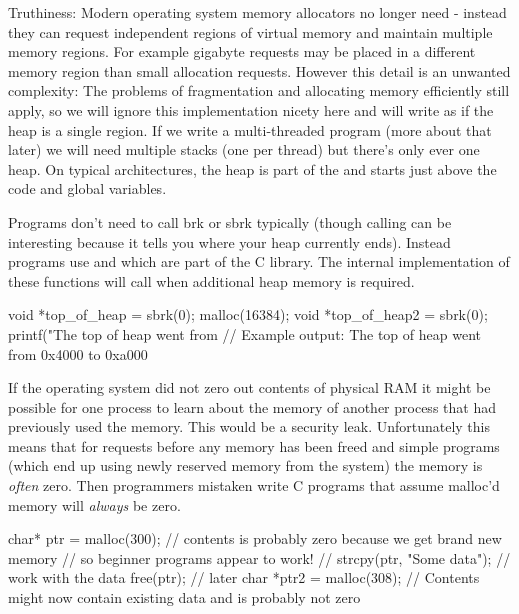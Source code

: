 Truthiness: Modern operating system memory allocators no longer need  - instead they can request independent regions of virtual memory and maintain multiple memory regions. For example gigabyte requests may be placed in a different memory region than small allocation requests. However this detail is an unwanted complexity: The problems of fragmentation and allocating memory efficiently still apply, so we will ignore this implementation nicety here and will write as if the heap is a single region. If we write a multi-threaded program (more about that later) we will need multiple stacks (one per thread) but there's only ever one heap. On typical architectures, the heap is part of the  and starts just above the code and global variables.

Programs don't need to call brk or sbrk typically (though calling  can be interesting because it tells you where your heap currently ends). Instead programs use  and  which are part of the C library. The internal implementation of these functions will call  when additional heap memory is required.

\begin{code}[language=C]
void *top_of_heap = sbrk(0);
malloc(16384);
void *top_of_heap2 = sbrk(0);
printf("The top of heap went from %
// Example output: The top of heap went from 0x4000 to 0xa000
\end{code}

If the operating system did not zero out contents of physical RAM it might be possible for one process to learn about the memory of another process that had previously used the memory. This would be a security leak. Unfortunately this means that for  requests before any memory has been freed and simple programs (which end up using newly reserved memory from the system) the memory is \emph{often} zero. Then programmers mistaken write C programs that assume malloc'd memory will \emph{always} be zero.

\begin{code}[language=C]
char* ptr = malloc(300);
// contents is probably zero because we get brand new memory
// so beginner programs appear to work!
// strcpy(ptr, "Some data"); // work with the data
free(ptr);
// later
char *ptr2 = malloc(308); // Contents might now contain existing data and is probably not zero
\end{code}

